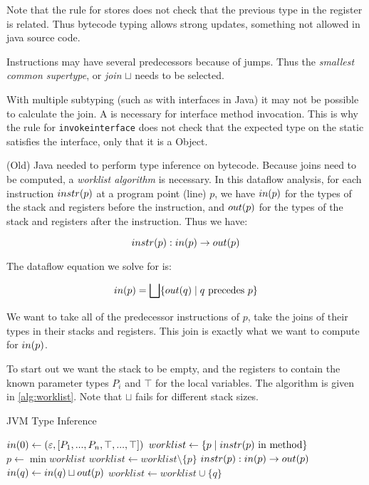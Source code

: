 \documentclass{article}
\begin{document}
\begin{remark}\label{remark:javaisdumb}
Note that the rule for stores does not check that the previous type in the register is related. Thus bytecode typing allows strong updates, something not allowed in java source code.
\end{remark}

Instructions may have several predecessors because of jumps. Thus the \textit{smallest common supertype}, or \textit{join} $\sqcup$ needs to be selected.

\begin{remark}\label{remark:interfacesaredumb}
  With multiple subtyping (such as with interfaces in Java) it may not be possible to calculate the join. A \runtimecheck{} is necessary for interface method invocation.
  This is why the rule for \texttt{invokeinterface} does not check that the expected type on the static satisfies the interface, only that it is a Object.
\end{remark}

(Old) Java needed to perform type inference on bytecode. Because joins need to be computed, a \textit{worklist algorithm} is necessary.
In this dataflow analysis, for each instruction $instr{}(p)$ at a program point (line) $p$, we have $in(p)$ for the types of the stack and registers before the instruction, and $out(p)$ for the types of the stack and registers after the instruction.
Thus we have:

\begin{equation}
instr{}(p) : in(p) \rightarrow out(p)
\end{equation}

The dataflow equation we solve for is:

\begin{equation}
in(p) = \bigsqcup \{ out(q) \mid q ~ \text{precedes} ~ p \}
\end{equation}

We want to take all of the predecessor instructions of $p$, take the joins of their types in their stacks and registers.
This join is exactly what we want to compute for $in(p)$.

To start out we want the stack to be empty, and the registers to contain the known parameter types $P_i$ and $\top$ for the local variables. The algorithm is given in \ref{alg:worklist}. Note that $\sqcup$ fails for different stack sizes.

\begin{algorithm}
\caption{JVM Type Inference}\label{alg:worklist}
\begin{algorithmic}
\State $in(0) \gets (\varepsilon, [P_1, ..., P_n, \top, ..., \top])$
\State $worklist \gets \{ p \mid instr{}(p) ~ \text{in method} \}$
\State $p \gets \min{worklist}$
\State $worklist \gets worklist \setminus \{ p \}$
\State $instr{}(p) : in(p) \rightarrow out(p)$ 
    \State $in(q) \gets in(q) \sqcup out(p)$
        \State $worklist \gets worklist \cup \{ q \}$
    \EndIf
\EndFor
\EndWhile
\end{algorithmic}
\end{algorithm}
\end{document}
